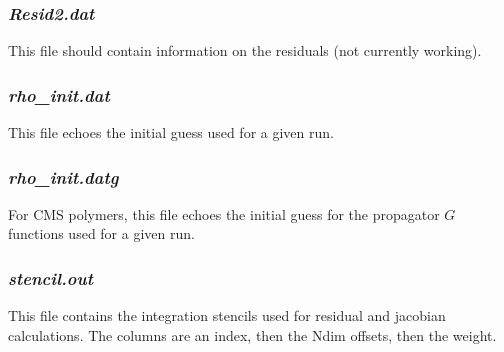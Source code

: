 \documentclass[10pt,onecolumn]{article}
\begin{document}
\subsubsection{{\it Resid2.dat}}
This file should contain information on the residuals (not currently working).

\subsubsection{{\it rho\_init.dat}}
This file echoes the initial guess used for a given run.

\subsubsection{{\it rho\_init.datg}}
For CMS polymers, this file echoes the initial guess for the propagator $G$ functions used for a given run.

\subsubsection{{\it stencil.out}}
This file contains the integration stencils used for residual and jacobian calculations.  The
columns are an index, then the Ndim offsets, then the weight.


\clearpage


\end{document}
